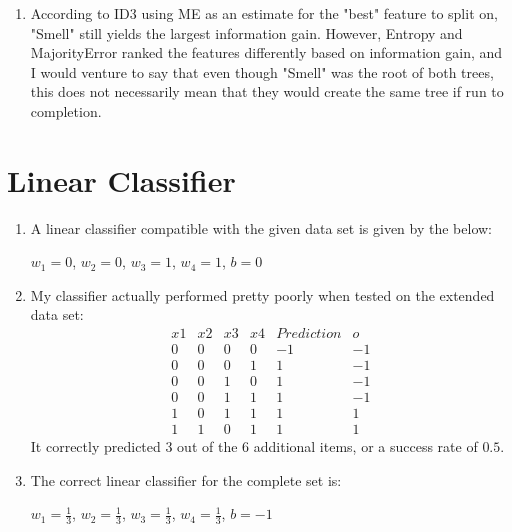 \documentclass[11pt,a4paper,draft]{article}
\begin{document}
\begin{enumerate}
\begin{enumerate}
			\item According to ID3 using ME as an estimate for the "best" feature to split on, "Smell" still yields the largest information gain. However, Entropy and MajorityError ranked the features differently based on information gain, and I would venture to say that even though "Smell" was the root of both trees, this does not necessarily mean that they would create the same tree if run to completion.
		\end{enumerate}	
	\end{enumerate}
	
	\section{Linear Classifier}
		\begin{enumerate}
			\item A linear classifier compatible with the given data set is given by the below:
			\begin{center}
				$w_1=0$, $w_2=0$, $w_3=1$, $w_4=1$, $b=0$
			\end{center}
		
			\item My classifier actually performed pretty poorly when tested on the extended data set:\\
				$$\begin{array}{cccc|c|c}
					x1 & x2 & x3 & x4 & Prediction & o \\ \hline
					0 & 0 & 0 & 0 & -1 & -1 \\
					0 & 0 & 0 & 1 & 1  & -1 \\
					0 & 0 & 1 & 0 & 1  & -1 \\
					0 & 0 & 1 & 1 & 1  & -1 \\
					1 & 0 & 1 & 1 & 1  & 1  \\
					1 & 1 & 0 & 1 & 1  & 1
				\end{array}$$ It correctly predicted 3 out of the 6 additional items, or a success rate of $0.5$.
				
				\item The correct linear classifier for the complete set is:
				\begin{center}
					$w_1=\frac{1}{3}$, $w_2=\frac{1}{3}$, $w_3=\frac{1}{3}$, $w_4=\frac{1}{3}$, $b=-1$
				\end{center}
			
		\end{enumerate}
	
\end{document}
